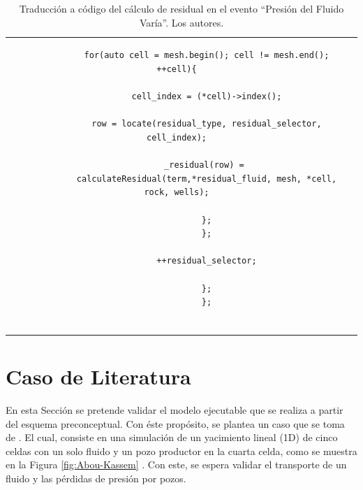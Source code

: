 \begin{table}[h!]
\begin{tabular}{cc}
\begin{tiny}
\begin{lstlisting}
			for(auto cell = mesh.begin(); cell != mesh.end(); ++cell){
			
			cell_index = (*cell)->index();
			
			row = locate(residual_type, residual_selector, cell_index);
			
			_residual(row) = 
			calculateResidual(term,*residual_fluid, mesh, *cell, rock, wells);
			
			};
			};
			
			++residual_selector;
			
			};
			};
			
			\end{lstlisting}
		\end{tiny}
	\end{tabular}
	\caption[Traducción a código del cálculo de residual en el evento ``Presión del Fluido Varía''.]{Traducción a código del cálculo de residual en el evento ``Presión del Fluido Varía''. Los autores. \label{tab:ResidualCode}}
\end{table}


\section{Caso de Literatura}
En esta Sección se pretende validar el modelo ejecutable que se realiza a partir del esquema preconceptual. Con éste propósito, se plantea un caso que se toma de \cite{jamal2006petroleum}. El cual, consiste en una simulación de un yacimiento lineal (1D) de cinco celdas con un solo fluido y un pozo productor en la cuarta celda, como se muestra en la Figura \ref{fig:Abou-Kassem} \citep{jamal2006petroleum}. Con este, se espera validar el transporte de un fluido y las pérdidas de presión por pozos.\\

